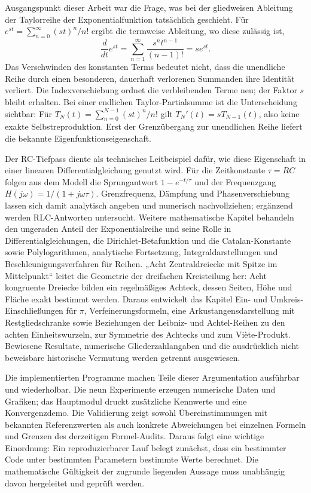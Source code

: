 \documentclass[a4paper,12pt,twoside]{report}
\theoremstyle{definition}
\begin{document}
Ausgangspunkt dieser Arbeit war die Frage, was bei der gliedweisen Ableitung der Taylorreihe der Exponentialfunktion tatsächlich geschieht. Für $e^{st}=\sum_{n=0}^{\infty}(st)^n/n!$ ergibt die termweise Ableitung, wo diese zulässig ist,
\[
\frac{d}{dt}e^{st}=\sum_{n=1}^{\infty}\frac{s^n t^{n-1}}{(n-1)!}=s e^{st}.
\]
Das Verschwinden des konstanten Terms bedeutet nicht, dass die unendliche Reihe durch einen besonderen, dauerhaft verlorenen Summanden ihre Identität verliert. Die Indexverschiebung ordnet die verbleibenden Terme neu; der Faktor $s$ bleibt erhalten. Bei einer endlichen Taylor-Partialsumme ist die Unterscheidung sichtbar: Für $T_N(t)=\sum_{n=0}^{N-1}(st)^n/n!$ gilt $T_N'(t)=sT_{N-1}(t)$, also keine exakte Selbstreproduktion. Erst der Grenzübergang zur unendlichen Reihe liefert die bekannte Eigenfunktionseigenschaft.

Der RC-Tiefpass diente als technisches Leitbeispiel dafür, wie diese Eigenschaft in einer linearen Differentialgleichung genutzt wird. Für die Zeitkonstante $\tau=RC$ folgen aus dem Modell die Sprungantwort $1-e^{-t/\tau}$ und der Frequenzgang $H(j\omega)=1/(1+j\omega\tau)$. Grenzfrequenz, Dämpfung und Phasenverschiebung lassen sich damit analytisch angeben und numerisch nachvollziehen; ergänzend werden RLC-Antworten untersucht. Weitere mathematische Kapitel behandeln den ungeraden Anteil der Exponentialreihe und seine Rolle in Differentialgleichungen, die Dirichlet-Betafunktion und die Catalan-Konstante sowie Polylogarithmen, analytische Fortsetzung, Integraldarstellungen und Beschleunigungsverfahren für Reihen. „Acht Zentraldreiecke mit Spitze im Mittelpunkt“ leitet die Geometrie der dreifachen Kreisteilung her: Acht kongruente Dreiecke bilden ein regelmäßiges Achteck, dessen Seiten, Höhe und Fläche exakt bestimmt werden. Daraus entwickelt das Kapitel Ein- und Umkreis-Einschließungen für $\pi$, Verfeinerungsformeln, eine Arkustangensdarstellung mit Restgliedschranke sowie Beziehungen der Leibniz- und Achtel-Reihen zu den achten Einheitswurzeln, zur Symmetrie des Achtecks und zum Viète-Produkt. Bewiesene Resultate, numerische Gliederzahlangaben und die ausdrücklich nicht beweisbare historische Vermutung werden getrennt ausgewiesen.

Die implementierten Programme machen Teile dieser Argumentation ausführbar und wiederholbar. Die neun Experimente erzeugen numerische Daten und Grafiken; das Hauptmodul druckt zusätzliche Kennwerte und eine Konvergenzdemo. Die Validierung zeigt sowohl Übereinstimmungen mit bekannten Referenzwerten als auch konkrete Abweichungen bei einzelnen Formeln und Grenzen des derzeitigen Formel-Audits. Daraus folgt eine wichtige Einordnung: Ein reproduzierbarer Lauf belegt zunächst, dass ein bestimmter Code unter bestimmten Parametern bestimmte Werte berechnet. Die mathematische Gültigkeit der zugrunde liegenden Aussage muss unabhängig davon hergeleitet und geprüft werden.
\end{document}
